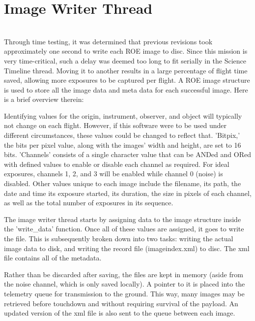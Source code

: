 %
\section{Image Writer Thread}
\hrulefill
\\

Through time testing, it was determined that previous revisions took approximately one second to write each ROE image to disc. Since this mission is very time-critical, such a delay was deemed too long to fit serially in the Science Timeline thread. Moving it to another results in a large percentage of flight time saved, allowing more exposures to be captured per flight.
A ROE image structure is used to store all the image data and meta data for each successful image. Here is a brief overview therein:

Identifying values for the origin, instrument, observer, and object will typically not change on each flight. However, if this software were to be used under different circumstances, these values could be changed to reflect that. 'Bitpix,' the bits per pixel value, along with the images' width and height, are set to 16 bits. 'Channels' consists of a single character value that can be ANDed and ORed with defined values to enable or disable each channel as required. For ideal exposures, channels 1, 2, and 3 will be enabled while channel 0 (noise) is disabled. Other values unique to each image include the filename, its path, the date and time its exposure started, its duration, the size in pixels of each channel, as well as the total number of exposures in its sequence.  

The image writer thread starts by assigning data to the image structure inside the 'write\_data' function. Once all of these values are assigned, it goes to write the file. This is subsequently broken down into two tasks: writing the actual image data to disk, and writing the record file (imageindex.xml) to disc. The xml file contains all of the metadata. 

Rather than be discarded after saving, the files are kept in memory (aside from the noise channel, which is only saved locally). A pointer to it is placed into the telemetry queue for transmission to the ground. This way, many images may be retrieved before touchdown and without requiring survival of the payload. An updated version of the xml file is also sent to the queue between each image.

